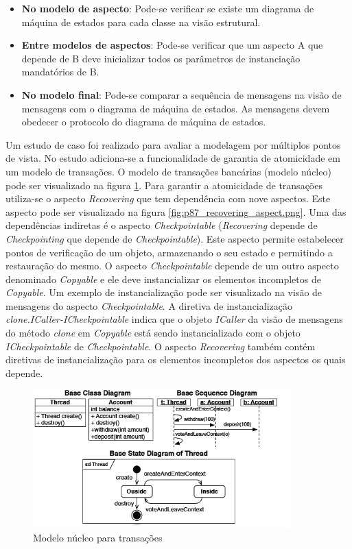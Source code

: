\begin{itemize}
  \item \textbf{No modelo de aspecto}: Pode-se verificar se existe um diagrama de máquina de estados para cada classe na visão estrutural.
  \item \textbf{Entre modelos de aspectos}: Pode-se verificar que um aspecto A que depende de B deve inicializar todos os parâmetros de instanciação
  mandatórios de B.
  \item \textbf{No modelo final}: Pode-se comparar a sequência de mensagens na visão de mensagens com o diagrama de máquina de estados. As mensagens
  devem obedecer o protocolo do diagrama de máquina de estados.
\end{itemize}

Um estudo de caso foi realizado para avaliar a modelagem por múltiplos pontos de vista. No estudo adiciona-se a funcionalidade de garantia de
atomicidade em um modelo de transações. O modelo de transações bancárias (modelo núcleo) pode ser visualizado na figura \ref{fig:p87_base_model}. Para
garantir a atomicidade de transações utiliza-se o aspecto \textit{Recovering} que tem dependência com nove aspectos. Este aspecto pode ser visualizado 
na figura \ref{fig:p87_recovering_aspect.png}. Uma das dependências indiretas é o aspecto \textit{Checkpointable} (\textit{Recovering} depende de
\textit{Checkpointing} que depende de \textit{Checkpointable}). Este aspecto permite estabelecer pontos de verificação de um objeto, armazenando o seu estado e permitindo a restauração do mesmo. O aspecto \textit{Checkpointable} depende 
de um outro aspecto denominado \textit{Copyable} e ele deve instancializar os elementos incompletos de \textit{Copyable}. Um exemplo de
instancialização pode ser visualizado na visão de mensagens do aspecto \textit{Checkpointable}. A diretiva de instancialização \textit{clone.ICaller-ICheckpointable} 
indica que o objeto \textit{ICaller} da visão de mensagens do método \textit{clone} em \textit{Copyable} está sendo instancializado com o objeto
\textit{ICheckpointable} de \textit{Checkpointable}. O aspecto \textit{Recovering} também contém diretivas de instancialização para os elementos 
incompletos dos aspectos os quais depende.

\begin{figure}[!hb]
	\centering
	\includegraphics[width=375px]{img/p87_base_model.png}
	\caption{Modelo núcleo para transações}\label{fig:p87_base_model}
\end{figure}

